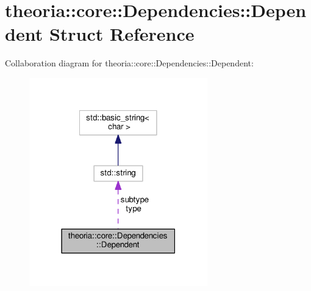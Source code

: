 \hypertarget{structtheoria_1_1core_1_1Dependencies_1_1Dependent}{\section{theoria\+:\+:core\+:\+:Dependencies\+:\+:Dependent Struct Reference}
\label{structtheoria_1_1core_1_1Dependencies_1_1Dependent}
}


Collaboration diagram for theoria\+:\+:core\+:\+:Dependencies\+:\+:Dependent\+:
\nopagebreak
\begin{figure}[H]
\begin{center}
\leavevmode
\includegraphics[width=219pt]{structtheoria_1_1core_1_1Dependencies_1_1Dependent__coll__graph}
\end{center}
\end{figure}
